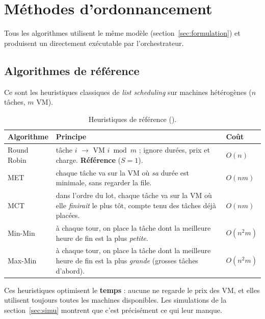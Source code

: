 \section{Méthodes d'ordonnancement}
\label{sec:algos}

Tous les algorithmes utilisent le même modèle (section~\ref{sec:formulation}) et
produisent un  directement exécutable par l'orchestrateur.

\subsection{Algorithmes de référence}

Ce sont les heuristiques classiques de \emph{list scheduling} sur machines
hétérogènes ($n$ tâches, $m$ VM).

\begin{table}[H]
\centering\small
\begin{tabularx}{\textwidth}{>{\raggedright\arraybackslash}p{2.1cm}X>{\raggedright\arraybackslash}p{1.7cm}}
\toprule
\textbf{Algorithme} & \textbf{Principe} & \textbf{Coût} \\
\midrule
Round Robin & tâche $i$ $\rightarrow$ VM $i \bmod m$ ; ignore durées, prix et charge. \textbf{Référence} ($S = 1$). & $O(n)$ \\
MET & chaque tâche va sur la VM où \emph{sa} durée est minimale, sans regarder la file. & $O(nm)$ \\
MCT & dans l'ordre du lot, chaque tâche va sur la VM où elle \emph{finirait} le plus tôt, compte tenu des tâches déjà placées. & $O(nm)$ \\
Min-Min & à chaque tour, on place la tâche dont la meilleure heure de fin est la plus \emph{petite}. & $O(n^2 m)$ \\
Max-Min & à chaque tour, on place la tâche dont la meilleure heure de fin est la plus \emph{grande} (grosses tâches d'abord). & $O(n^2 m)$ \\
\bottomrule
\end{tabularx}
\caption{Heuristiques de référence ().}
\end{table}

Ces heuristiques optimisent le \textbf{temps} : aucune ne regarde le prix des VM,
et elles utilisent toujours toutes les machines disponibles. Les simulations de
la section~\ref{sec:simu} montrent que c'est précisément ce qui leur manque.

